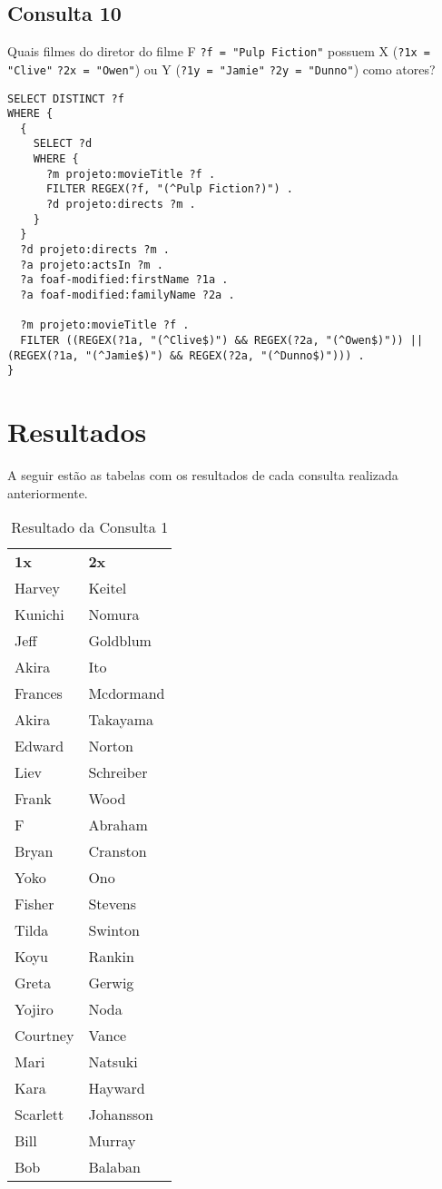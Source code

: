 \documentclass{article}
\newcommand{\code}[1]{\lstinline[mathescape=true]{#1}}
\begin{document}
\subsection{Consulta 10}
Quais filmes do diretor do filme F \code{?f = "Pulp Fiction"} possuem X (\code{?1x = "Clive"} \code{?2x = "Owen"}) ou Y (\code{?1y = "Jamie"} \code{?2y = "Dunno"}) como atores?
\begin{lstlisting}[basicstyle=\ttfamily,frame=single]
SELECT DISTINCT ?f
WHERE {
  {
    SELECT ?d
    WHERE {
      ?m projeto:movieTitle ?f .
      FILTER REGEX(?f, "(^Pulp Fiction?)") .
      ?d projeto:directs ?m .
    }
  }
  ?d projeto:directs ?m .
  ?a projeto:actsIn ?m .
  ?a foaf-modified:firstName ?1a .
  ?a foaf-modified:familyName ?2a .
   
  ?m projeto:movieTitle ?f .
  FILTER ((REGEX(?1a, "(^Clive$)") && REGEX(?2a, "(^Owen$)")) || (REGEX(?1a, "(^Jamie$)") && REGEX(?2a, "(^Dunno$)"))) .
}
\end{lstlisting}
\section{Resultados}

A seguir estão as tabelas com os resultados de cada consulta realizada anteriormente.

\begin{table}[htbp]
\begin{center}
\begin{tabular}{ll}

\textbf{1x} & \textbf{2x} \\ 
Harvey & Keitel \\ 
Kunichi & Nomura \\ 
Jeff & Goldblum \\ 
Akira & Ito \\ 
Frances & Mcdormand \\ 
Akira & Takayama \\ 
Edward & Norton \\ 
Liev & Schreiber \\ 
Frank & Wood \\ 
F & Abraham \\ 
Bryan & Cranston \\ 
Yoko & Ono \\ 
Fisher & Stevens \\ 
Tilda & Swinton \\ 
Koyu & Rankin \\ 
Greta & Gerwig \\ 
Yojiro & Noda \\ 
Courtney & Vance \\ 
Mari & Natsuki \\ 
Kara & Hayward \\ 
Scarlett & Johansson \\ 
Bill & Murray \\ 
Bob & Balaban \\ 
\end{tabular}
\end{center}
\caption{Resultado da Consulta 1}
\label{}
\end{table}
\end{document}
